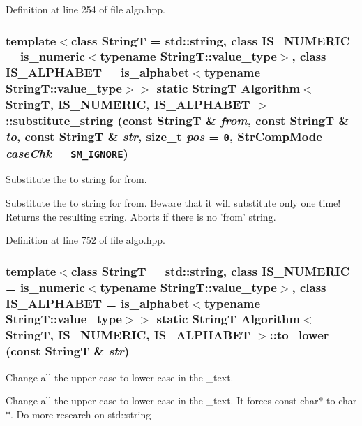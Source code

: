 Definition at line 254 of file algo.hpp.\hypertarget{classAlgorithm_658530c0e10cee77d1c94801efc28b1d}{
\subsubsection[{substitute\_\-string}]{\setlength{\rightskip}{0pt plus 5cm}template$<$class StringT  = std::string, class IS\_\-NUMERIC  = is\_\-numeric$<$typename StringT::value\_\-type$>$, class IS\_\-ALPHABET  = is\_\-alphabet$<$typename StringT::value\_\-type$>$$>$ static StringT {\bf Algorithm}$<$ StringT, IS\_\-NUMERIC, IS\_\-ALPHABET $>$::substitute\_\-string (const StringT \& {\em from}, \/  const StringT \& {\em to}, \/  const StringT \& {\em str}, \/  size\_\-t {\em pos} = {\tt 0}, \/  StrCompMode {\em caseChk} = {\tt SM\_\-IGNORE})}}
\label{classAlgorithm_658530c0e10cee77d1c94801efc28b1d}


Substitute the to string for from. 

Substitute the to string for from. Beware that it will substitute only one time! Returns the resulting string. Aborts if there is no 'from' string. 

Definition at line 752 of file algo.hpp.\hypertarget{classAlgorithm_617415dba55cc4533e4776760178032b}{
\subsubsection[{to\_\-lower}]{\setlength{\rightskip}{0pt plus 5cm}template$<$class StringT  = std::string, class IS\_\-NUMERIC  = is\_\-numeric$<$typename StringT::value\_\-type$>$, class IS\_\-ALPHABET  = is\_\-alphabet$<$typename StringT::value\_\-type$>$$>$ static StringT {\bf Algorithm}$<$ StringT, IS\_\-NUMERIC, IS\_\-ALPHABET $>$::to\_\-lower (const StringT \& {\em str})}}
\label{classAlgorithm_617415dba55cc4533e4776760178032b}


Change all the upper case to lower case in the \_\-text. 

Change all the upper case to lower case in the \_\-text. It forces const char$\ast$ to char$\ast$. Do more research on std::string 

